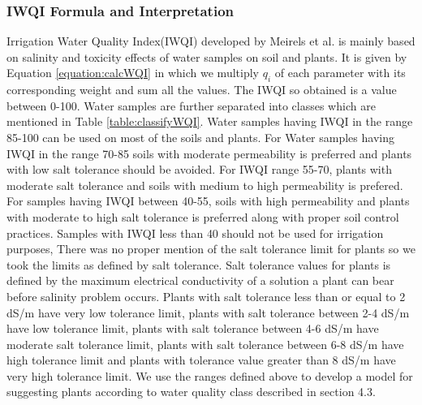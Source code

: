 \subsubsection{IWQI Formula and Interpretation}
\label{subsubsection:IWQIformulaAndInterpretation}
Irrigation Water Quality Index(IWQI) developed by Meirels et al. is mainly based on salinity and toxicity effects of water samples on soil and plants. It is given by Equation \ref{equation:calcWQI} in which we multiply $q_i$ of each parameter with its corresponding weight and sum all the values. The IWQI so obtained is a value between 0-100. Water samples are further separated into classes which are mentioned in Table \ref{table:classifyWQI}. Water samples having IWQI in the range  85-100 can be used on most of the soils and plants. For Water samples having IWQI in the range 70-85 soils with moderate permeability is preferred and plants with low salt tolerance should be avoided. For IWQI range 55-70, plants with moderate salt tolerance and soils with medium to high permeability is prefered. For  samples having IWQI between 40-55, soils with high permeability and plants with moderate to high salt tolerance is preferred along with proper soil control practices. Samples with IWQI less than 40 should not be used for irrigation purposes, There was no proper mention of the salt tolerance limit for plants so we took the limits as defined by salt tolerance\cite{article:saltTolerance}. Salt tolerance values for plants is defined by the maximum electrical conductivity of a solution a plant can bear before salinity problem occurs. Plants with salt tolerance less than or equal to 2 dS/m have very low tolerance limit, plants with salt tolerance between 2-4 dS/m have low tolerance limit, plants with salt tolerance between 4-6 dS/m have moderate salt tolerance limit, plants with salt tolerance between 6-8 dS/m have high tolerance limit and plants with tolerance value greater than 8 dS/m have very high tolerance limit. We use the ranges defined above to develop a model for suggesting plants according to water quality class described in section 4.3. 

